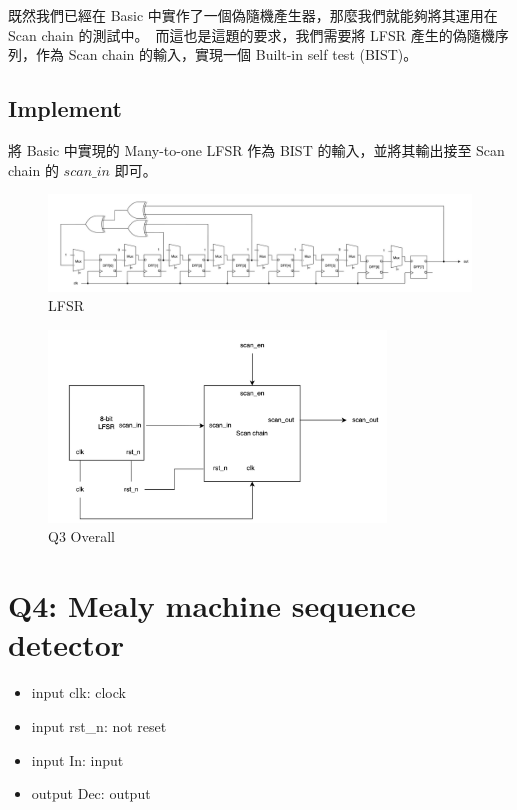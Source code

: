\documentclass[10.5pt,compsoc,UTF8]{CjC}
\theoremstyle{mystyle}
\begin{document}
既然我們已經在 Basic 中實作了一個偽隨機產生器，那麼我們就能夠將其運用在 Scan chain 的測試中。\
而這也是這題的要求，我們需要將 LFSR 產生的偽隨機序列，作為 Scan chain 的輸入，實現一個 Built-in self test (BIST)。
\newpage
\subsection{Implement}
將 Basic 中實現的 Many-to-one LFSR 作為 BIST 的輸入，並將其輸出接至 Scan chain 的 $scan\_in$ 即可。

\begin{figure}[h!]
  \centering
  \includegraphics[width=\textwidth]{./img/Q3-LFSR.png}
  \caption{LFSR}
  \label{fig:LFSR}
\end{figure}

\begin{figure}[h!]
  \centering
  \includegraphics[width=0.8\textwidth]{./img/Q3.png}
  \caption{Q3 Overall}
  \label{fig:Q3-Overall}
\end{figure}

\section{Q4: Mealy machine sequence detector}
\begin{itemize}
  \item input clk: clock
  \item input rst\_n: not reset
  \item input In: input
  \item output Dec: output
\end{itemize}
\end{document}
